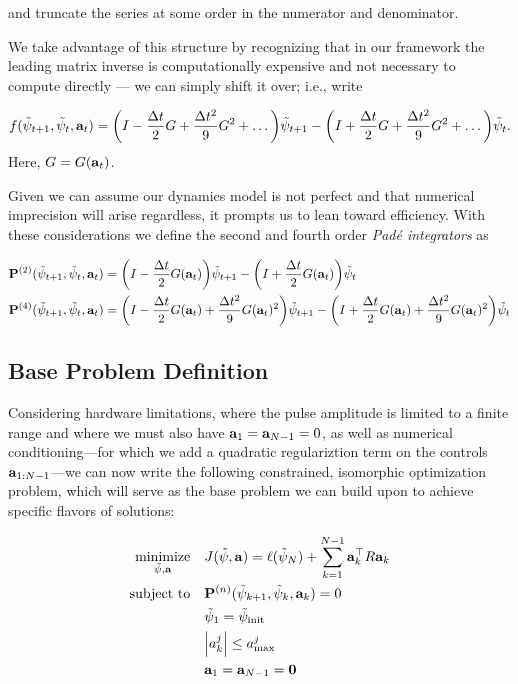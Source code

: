 \documentclass{article}
\newcommand{\isopsi}{\tilde \psi}
\newcommand{\minimize}[1]{\underset{#1}{\text{minimize}}}
\newcommand{\st}{\text{subject to}}
\begin{document}
\noindent
and truncate the series at some order in the numerator and denominator.  

We take advantage of this structure by recognizing that in our framework the leading matrix inverse is computationally expensive and not necessary to compute directly --- we can simply shift it over; i.e., write

\begin{equation}
  f(\isopsi_{t+1}, \isopsi_t, \vb{a}_t) = \qty(I - \frac{\Delta t}{2} G + \frac{\Delta t^2}{9} G^2 + \dots) \isopsi_{t+1} - \qty(I + \frac{\Delta t}{2} G + \frac{\Delta t^2}{9} G^2 + \dots) \isopsi_t.
\end{equation}
\noindent
Here, $G = G(\vb{a}_t)$.

Given we can assume our dynamics model is not perfect and that numerical imprecision will arise regardless, it prompts us to lean toward efficiency. With these considerations we define the second and fourth order \textit{Pad\'e integrators} as 

\begin{align}
  \vb{P}^{(2)}(\isopsi_{t+1}, \isopsi_t, \vb{a}_t) &= \qty(I - \frac{\Delta t}{2} G(\vb{a}_t) ) \isopsi_{t+1} - \qty(I + \frac{\Delta t}{2} G(\vb{a}_t) ) \isopsi_t \\
  \vb{P}^{(4)}(\isopsi_{t+1}, \isopsi_t, \vb{a}_t) &= \qty(I - \frac{\Delta t}{2} G(\vb{a}_t)  + \frac{\Delta t^2}{9} G(\vb{a}_t) ^2) \isopsi_{t+1} - \qty(I + \frac{\Delta t}{2} G(\vb{a}_t)  + \frac{\Delta t^2}{9} G(\vb{a}_t) ^2) \isopsi_t
\end{align}

\subsection{Base Problem Definition}

Considering hardware limitations, where the pulse amplitude is limited to a finite range and where we must also have $\vb{a}_1 = \vb{a}_{N-1} = 0$, as well as numerical conditioning---for which we add a quadratic regulariztion term on the controls $\vb{a}_{1:N-1}$---we can now write the following constrained, isomorphic optimization problem, which will serve as the base problem we can build upon to achieve specific flavors of solutions:

\begin{align}
  \minimize{\isopsi, \vb{a}} \quad & J(\isopsi, \vb{a}) = \ell(\isopsi_N) + \sum_{k=1}^{N-1} \vb{a}_k^\top R \vb{a}_k \\
  \st \quad & \vb{P}^{(n)}(\isopsi_{k+1}, \isopsi_k, \vb{a}_k) = 0 \\
            & \isopsi_1 = \isopsi_{\text{init}} \\
            & \abs{a^j_k} \leq a_{\max}^j \\
            & \vb{a}_1 = \vb{a}_{N-1} = \vb{0} 
\end{align}
\end{document}
